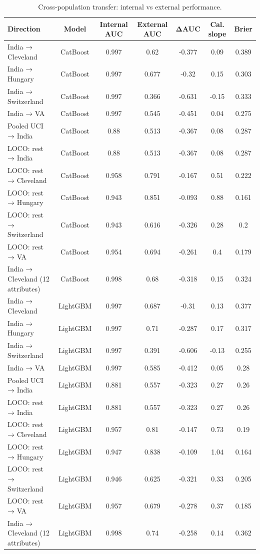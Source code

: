 \begin{table}[t]
\centering
\small
\caption{Cross-population transfer: internal vs external performance.}
\label{tab:transfer}
\begin{tabular}{lcccccc}
\toprule
Direction & Model & Internal AUC & External AUC & ΔAUC & Cal. slope & Brier \\
\midrule
India → Cleveland & CatBoost & 0.997 & 0.62 & -0.377 & 0.09 & 0.389 \\
India → Hungary & CatBoost & 0.997 & 0.677 & -0.32 & 0.15 & 0.303 \\
India → Switzerland & CatBoost & 0.997 & 0.366 & -0.631 & -0.15 & 0.333 \\
India → VA & CatBoost & 0.997 & 0.545 & -0.451 & 0.04 & 0.275 \\
Pooled UCI → India & CatBoost & 0.88 & 0.513 & -0.367 & 0.08 & 0.287 \\
LOCO: rest → India & CatBoost & 0.88 & 0.513 & -0.367 & 0.08 & 0.287 \\
LOCO: rest → Cleveland & CatBoost & 0.958 & 0.791 & -0.167 & 0.51 & 0.222 \\
LOCO: rest → Hungary & CatBoost & 0.943 & 0.851 & -0.093 & 0.88 & 0.161 \\
LOCO: rest → Switzerland & CatBoost & 0.943 & 0.616 & -0.326 & 0.28 & 0.2 \\
LOCO: rest → VA & CatBoost & 0.954 & 0.694 & -0.261 & 0.4 & 0.179 \\
India → Cleveland (12 attributes) & CatBoost & 0.998 & 0.68 & -0.318 & 0.15 & 0.324 \\
India → Cleveland & LightGBM & 0.997 & 0.687 & -0.31 & 0.13 & 0.377 \\
India → Hungary & LightGBM & 0.997 & 0.71 & -0.287 & 0.17 & 0.317 \\
India → Switzerland & LightGBM & 0.997 & 0.391 & -0.606 & -0.13 & 0.255 \\
India → VA & LightGBM & 0.997 & 0.585 & -0.412 & 0.05 & 0.28 \\
Pooled UCI → India & LightGBM & 0.881 & 0.557 & -0.323 & 0.27 & 0.26 \\
LOCO: rest → India & LightGBM & 0.881 & 0.557 & -0.323 & 0.27 & 0.26 \\
LOCO: rest → Cleveland & LightGBM & 0.957 & 0.81 & -0.147 & 0.73 & 0.19 \\
LOCO: rest → Hungary & LightGBM & 0.947 & 0.838 & -0.109 & 1.04 & 0.164 \\
LOCO: rest → Switzerland & LightGBM & 0.946 & 0.625 & -0.321 & 0.33 & 0.205 \\
LOCO: rest → VA & LightGBM & 0.957 & 0.679 & -0.278 & 0.37 & 0.185 \\
India → Cleveland (12 attributes) & LightGBM & 0.998 & 0.74 & -0.258 & 0.14 & 0.362 \\
\bottomrule
\end{tabular}
\end{table}
